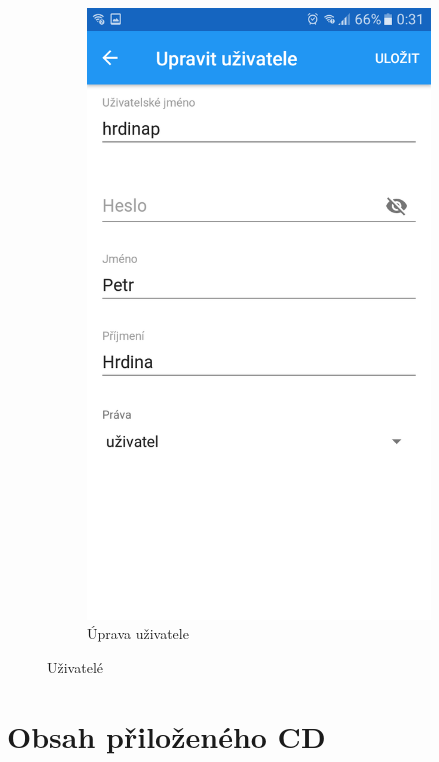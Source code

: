 \documentclass[czech,BP]{thesiskiv}
\begin{document}
\begin{figure}[H]
\begin{subfigure}[b]{0.3\textwidth}
	\includegraphics[width=\textwidth]{../images/client_android/Screenshot_20170612-003127.png}	
	\caption{Úprava uživatele}
	\label{fig:Screenshot_20170612-003127}
  \end{subfigure}
  \caption{Uživatelé}
\end{figure}

	
	

\chapter{Obsah přiloženého CD}
\end{document}
